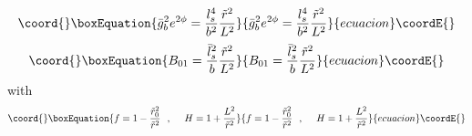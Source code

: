 \documentclass[a4paper,twoside,titlepage,12pt]{article}
\begin{document}
%
\begin{equation}\coord{}\boxEquation{
\label{NHF1D5dil}
\gsbb^2 e^{2\phi} 
= \frac{\lsn^4}{b^2} \frac{\tilde{r}^2}{L^2}
}{
\gsbb^2 e^{2\phi} 
= \frac{\lsn^4}{b^2} \frac{\tilde{r}^2}{L^2}
}{ecuacion}\coordE{}\end{equation}
%
\begin{equation}\coord{}\boxEquation{
\label{NHF1D5pot}
B_{01} = \frac{\lsb^2}{b} \frac{\tilde{r}^2}{L^2}
}{
B_{01} = \frac{\lsb^2}{b} \frac{\tilde{r}^2}{L^2}
}{ecuacion}\coordE{}\end{equation}
%
with
%
\begin{equation}\coord{}\boxEquation{
\label{NHF1D5defs}
f = 1 - \frac{\tilde{r}_0^2}{\tilde{r}^2} \spa
H = 1 + \frac{L^2}{\tilde{r}^2}
}{
f = 1 - \frac{\tilde{r}_0^2}{\tilde{r}^2} \spa
H = 1 + \frac{L^2}{\tilde{r}^2}
}{ecuacion}\coordE{}\end{equation}
%
\end{document}
